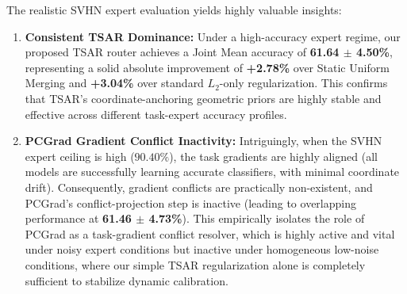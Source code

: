 The realistic SVHN expert evaluation yields highly valuable insights:
\begin{enumerate}
    \item \textbf{Consistent TSAR Dominance:} Under a high-accuracy expert regime, our proposed TSAR router achieves a Joint Mean accuracy of \textbf{61.64 $\pm$ 4.50\%}, representing a solid absolute improvement of \textbf{+2.78\%} over Static Uniform Merging and \textbf{+3.04\%} over standard $L_2$-only regularization. This confirms that TSAR's coordinate-anchoring geometric priors are highly stable and effective across different task-expert accuracy profiles.
    \item \textbf{PCGrad Gradient Conflict Inactivity:} Intriguingly, when the SVHN expert ceiling is high ($90.40\%$), the task gradients are highly aligned (all models are successfully learning accurate classifiers, with minimal coordinate drift). Consequently, gradient conflicts are practically non-existent, and PCGrad's conflict-projection step is inactive (leading to overlapping performance at \textbf{61.46 $\pm$ 4.73\%}). This empirically isolates the role of PCGrad as a task-gradient conflict resolver, which is highly active and vital under noisy expert conditions but inactive under homogeneous low-noise conditions, where our simple TSAR regularization alone is completely sufficient to stabilize dynamic calibration.
\end{enumerate}
